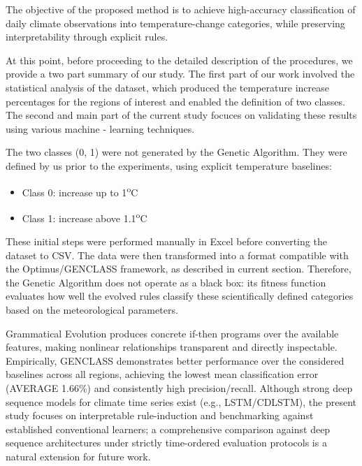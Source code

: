 \documentclass[12pt]{Definitions/academia}
\begin{document}
The objective of the proposed method is to achieve high-accuracy classification
of daily climate observations into temperature-change categories,
while preserving interpretability through explicit rules.

At this point, before proceeding to the detailed description of the procedures, we provide a two part summary of our study. The first part of our work involved the statistical analysis of the dataset, which produced the temperature increase percentages for the regions of interest and enabled the definition of two classes. The second and main part of the current study focuces on validating these results using various machine - learning techniques.

The two classes (0, 1) were not generated by the Genetic Algorithm. They were defined by us prior to the experiments, using explicit temperature baselines:
\begin{itemize}
	\item Class 0: increase up to 1\textsuperscript{o}C
	\item Class 1: increase above 1.1\textsuperscript{o}C
	\end{itemize}

These initial steps were performed manually in Excel before converting the dataset to CSV. The data were then transformed into a format compatible with the Optimus/GENCLASS framework, as described in current section. 
Therefore, the Genetic Algorithm does not operate as a black box: its fitness function evaluates how well the evolved rules classify these scientifically defined categories based on the meteorological parameters.

Grammatical Evolution produces concrete if-then programs over the available features,
making nonlinear relationships transparent and directly inspectable.
Empirically, GENCLASS demonstrates better performance over the considered
baselines  across all regions, achieving the
lowest mean classification error (AVERAGE 1.66\%) and consistently
high precision/recall. Although strong deep sequence models for climate
time series exist (e.g., LSTM/CDLSTM), the present study focuses on
interpretable rule-induction and benchmarking against established
conventional learners; a comprehensive comparison against deep sequence
architectures under strictly time-ordered evaluation protocols is
a natural extension for future work.
\end{document}
